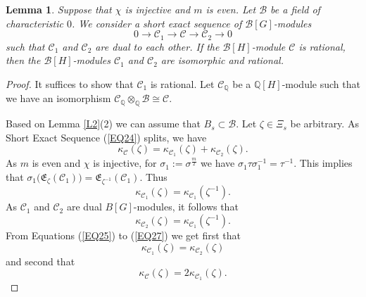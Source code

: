 \documentclass[11pt]{amsart}
\newtheorem{lemma}[theorem]{Lemma}
\begin{document}
\begin{lemma}\label{L4}
Suppose that $\chi$ is injective and $m$ is even. Let $\mathcal B$ be a field of characteristic $0$. We consider a short exact sequence of $\mathcal B[G]$-modules
\begin{equation}\label{EQ24}
0\rightarrow\mathcal C_1\rightarrow\mathcal C\rightarrow\mathcal C_2\rightarrow 0
\end{equation}
 such that $\mathcal C_1$ and $\mathcal C_2$ are dual to each other. If the $\mathcal B[H]$-module $\mathcal C$ is rational, then the $\mathcal B[H]$-modules $\mathcal C_1$ and $\mathcal C_2$ are isomorphic and rational.
\end{lemma}

\begin{proof}
It suffices to show that $\mathcal C_1$ is rational. Let $\mathcal C_{\mathbb Q}$ be a $\mathbb Q[H]$-module such that we have an isomorphism $\mathcal C_{\mathbb Q}\otimes_{\mathbb Q} \mathcal B\cong \mathcal C$.

Based on Lemma \ref{L2}(2) we can assume that $B_s\subset \mathcal B$. Let $\zeta\in\Xi_s$ be arbitrary. As Short Exact Sequence (\ref{EQ24}) splits, we have
\begin{equation}\label{EQ25}
\kappa_{\mathcal C}(\zeta)=\kappa_{\mathcal C_1}(\zeta)+ \kappa_{\mathcal C_2}(\zeta).
\end{equation}
As $m$ is even and $\chi$ is injective, for $\sigma_1:=\sigma^{\frac{m}{2}}$ we have $\sigma_1\tau\sigma_1^{-1}=\tau^{-1}$. This implies that $\sigma_1\bigl(\mathfrak E_{\zeta}(\mathcal C_1)\bigr)=\mathfrak E_{\zeta^{-1}}(\mathcal C_1)$. Thus 
\begin{equation}\label{EQ26}
\kappa_{\mathcal C_1}(\zeta)=\kappa_{\mathcal C_1}(\zeta^{-1}).
\end{equation}
As $\mathcal C_1$ and $\mathcal C_2$ are dual $B[G]$-modules, it follows that
\begin{equation}\label{EQ27}
\kappa_{\mathcal C_2}(\zeta)=\kappa_{\mathcal C_1}(\zeta^{-1}).
\end{equation}
From Equations (\ref{EQ25}) to (\ref{EQ27}) we get first that 
\begin{equation}\label{EQ28}
\kappa_{\mathcal C_1}(\zeta)=\kappa_{\mathcal C_2}(\zeta)
\end{equation}
and second that
\begin{equation}\label{EQ29}
\kappa_{\mathcal C}(\zeta)=2\kappa_{\mathcal C_1}(\zeta).
\end{equation}


\end{proof}
\end{document}
